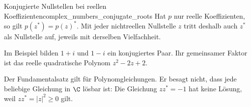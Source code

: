 \par\noindent\begin{minipage}{\linewidth}
\begin{KeyPointBox}{Konjugierte Nullstellen bei reellen Koeffizienten}{complex_numbers_conjugate_roots}
  Hat $p$ nur reelle Koeffizienten, so gilt $p(z^*)=p(z)^*$.
  Mit jeder nichtreellen Nullstelle $z$ tritt deshalb auch $z^*$ als
  Nullstelle auf, jeweils mit derselben Vielfachheit.
\end{KeyPointBox}
Im Beispiel bilden $1+i$ und $1-i$ ein konjugiertes Paar. Ihr gemeinsamer
Faktor ist das reelle quadratische Polynom $z^2-2z+2$.

\begin{RemarkBox}[remark title=Geltungsbereich des Fundamentalsatzes]
  Der Fundamentalsatz gilt für Polynomgleichungen. Er besagt nicht,
  dass jede beliebige Gleichung in $\C$ lösbar ist: Die Gleichung
  $zz^*=-1$ hat keine Lösung, weil $zz^*=|z|^2\ge0$ gilt.
\end{RemarkBox}
\end{minipage}\par
